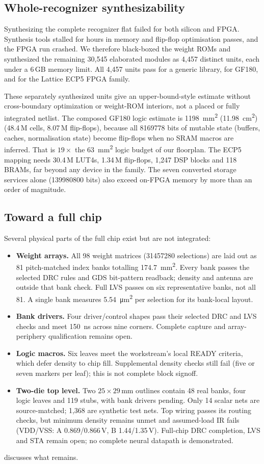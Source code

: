 \subsection{Whole-recognizer synthesizability}
Synthesizing the complete recognizer flat failed for both silicon and FPGA. Synthesis tools stalled for hours in memory and flip-flop optimisation passes, and the FPGA run crashed. We therefore black-boxed the weight ROMs and synthesized the remaining 30,545 elaborated modules as 4,457 distinct units, each under a 6\,GB memory limit. All 4,457 units pass for a generic library, for GF180, and for the Lattice ECP5 FPGA family.

These separately synthesized units give an upper-bound-style estimate without cross-boundary optimization or weight-ROM interiors, not a placed or fully integrated netlist. The composed GF180 logic estimate is \SI{1198}{mm^2} (\SI{11.98}{cm^2}) (48.4\,M cells, 8.07\,M flip-flops), because all \num{8169778} bits of mutable state (buffers, caches, normalisation state) become flip-flops when no SRAM macros are inferred. That is $19\times$ the \SI{63}{mm^2} logic budget of our floorplan. The ECP5 mapping needs 30.4\,M LUT4s, 1.34\,M flip-flops, 1,247 DSP blocks and 118 BRAMs, far beyond any device in the family. The seven converted storage services alone (\num{139980800} bits) also exceed on-FPGA memory by more than an order of magnitude.

\subsection{Toward a full chip}
Several physical parts of the full chip exist but are not integrated:
\begin{itemize}
\item \textbf{Weight arrays.} All 98 weight matrices (\num{31457280} selections) are laid out as 81 pitch-matched index banks totalling \SI{174.7}{mm^2}. Every bank passes the selected DRC rules and GDS bit-pattern readback; density and antenna are outside that bank check. Full LVS passes on six representative banks, not all 81. A single bank measures \SI{5.54}{\micro m^2} per selection for its bank-local layout.
\item \textbf{Bank drivers.} Four driver/control shapes pass their selected DRC and LVS checks and meet \SI{150}{ns} across nine corners. Complete capture and array-periphery qualification remains open.
\item \textbf{Logic macros.} Six leaves meet the workstream's local READY criteria, which defer density to chip fill. Supplemental density checks still fail (five or seven markers per leaf); this is not complete block signoff.
\item \textbf{Two-die top level.} Two $25\times29$\,mm outlines contain 48 real banks, four logic leaves and 119 stubs, with bank drivers pending. Only 14 scalar nets are source-matched; 1,368 are synthetic test nets. Top wiring passes its routing checks, but minimum density remains unmet and assumed-load IR fails (VDD/VSS: A 0.869/0.866\,V, B 1.44/1.35\,V). Full-chip DRC completion, LVS and STA remain open; no complete neural datapath is demonstrated.
\end{itemize}
 discusses what remains.
